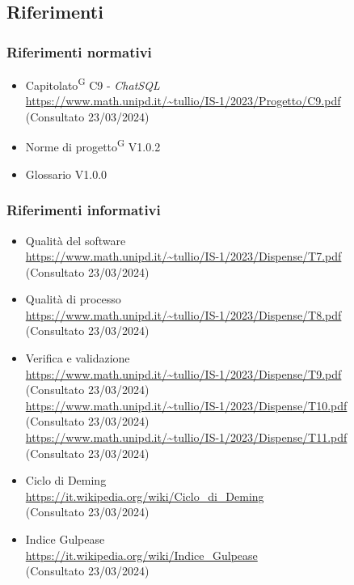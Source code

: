\documentclass[5pt]{article}
\begin{document}
	\subsection{Riferimenti}
	\subsubsection{Riferimenti normativi}
	\begin{itemize}
		\item Capitolato\textsuperscript{G} C9 - \textit{ChatSQL} \\ \url{https://www.math.unipd.it/~tullio/IS-1/2023/Progetto/C9.pdf} \\ (Consultato 23/03/2024)
		\item Norme di progetto\textsuperscript{G} V1.0.2
		\item Glossario V1.0.0
	\end{itemize}
	\subsubsection{Riferimenti informativi}
	\begin{itemize}
		\item Qualità del software \\ \url{https://www.math.unipd.it/~tullio/IS-1/2023/Dispense/T7.pdf} \\ (Consultato 23/03/2024)
		\item Qualità di processo \\ \url{https://www.math.unipd.it/~tullio/IS-1/2023/Dispense/T8.pdf} \\ (Consultato 23/03/2024)
		\item Verifica e validazione \\
		\url{https://www.math.unipd.it/~tullio/IS-1/2023/Dispense/T9.pdf} \\ (Consultato 23/03/2024) \\
		\url{https://www.math.unipd.it/~tullio/IS-1/2023/Dispense/T10.pdf} \\ (Consultato 23/03/2024) \\
		\url{https://www.math.unipd.it/~tullio/IS-1/2023/Dispense/T11.pdf} \\ (Consultato 23/03/2024)
		\item Ciclo di Deming \\
		\url{https://it.wikipedia.org/wiki/Ciclo_di_Deming} \\ (Consultato 23/03/2024)
		\item Indice Gulpease \\
		\url{https://it.wikipedia.org/wiki/Indice_Gulpease} \\ (Consultato 23/03/2024)
	\end{itemize}
	
\end{document}
